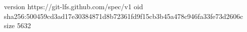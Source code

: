 version https://git-lfs.github.com/spec/v1
oid sha256:500459cd3ad17e30384871d8b72361fd9f15cb3b45a478c946fa33fe73d2606c
size 5632
